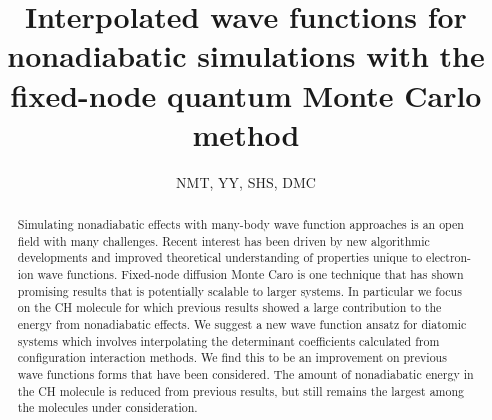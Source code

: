 \documentclass[aip,jcp,numerical,reprint]{revtex4-1}
\begin{document}
\title{Interpolated wave functions for nonadiabatic simulations with the fixed-node quantum Monte Carlo method}
\author{NMT, YY, SHS, DMC}

\begin{abstract}
Simulating nonadiabatic effects with many-body wave function approaches is an open field with many challenges.  %
Recent interest has been driven by new algorithmic developments and improved theoretical understanding of properties unique to electron-ion wave functions.  Fixed-node diffusion Monte Caro is one technique that has shown promising results that is potentially scalable to larger systems.
In particular we focus on the CH molecule for which previous results showed a large contribution to the energy from nonadiabatic effects.  We suggest a new wave function ansatz for diatomic systems which involves interpolating the determinant coefficients calculated from configuration interaction methods.    We find this to be an improvement on previous wave functions forms that have been considered.    The amount of nonadiabatic energy in the CH molecule is reduced from previous results, but still remains the largest among the molecules under consideration.

\end{abstract}
\maketitle
\end{document}
